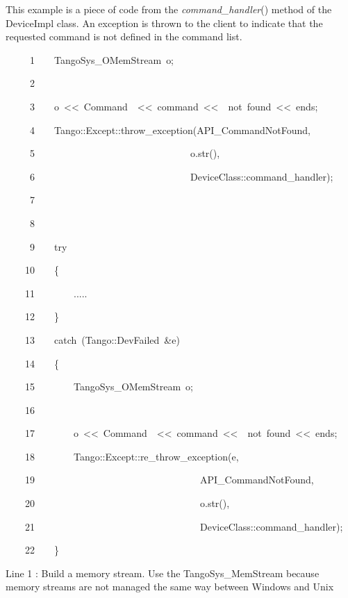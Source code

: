 This example is a piece of code from the \emph{command\_handler}()
method of the DeviceImpl class. An exception is
thrown to the client to indicate that the requested command is not
defined in the command list.


\begin{lyxcode}
~~~~~1~~~~TangoSys\_OMemStream~o;

~~~~~2~~~~~~~~~~~~~~~~~~

~~~~~3~~~~o~<\textcompwordmark{}<~\textquotedbl{}Command~\textquotedbl{}~<\textcompwordmark{}<~command~<\textcompwordmark{}<~\textquotedbl{}~not~found\textquotedbl{}~<\textcompwordmark{}<~ends;

~~~~~4~~~~Tango::Except::throw\_exception(\textquotedbl{}API\_CommandNotFound\textquotedbl{},

~~~~~5~~~~~~~~~~~~~~~~~~~~~~~~~~~~~~~~o.str(),

~~~~~6~~~~~~~~~~~~~~~~~~~~~~~~~~~~~~~~\textquotedbl{}DeviceClass::command\_handler\textquotedbl{});

~~~~~7~~

~~~~~8~~

~~~~~9~~~~try

~~~~10~~~~\{

~~~~11~~~~~~~~.....

~~~~12~~~~\}

~~~~13~~~~catch~(Tango::DevFailed~\&e)

~~~~14~~~~\{

~~~~15~~~~~~~~TangoSys\_OMemStream~o;

~~~~16~~~~~~~~~~~~~~~~~~

~~~~17~~~~~~~~o~<\textcompwordmark{}<~\textquotedbl{}Command~\textquotedbl{}~<\textcompwordmark{}<~command~<\textcompwordmark{}<~\textquotedbl{}~not~found\textquotedbl{}~<\textcompwordmark{}<~ends;

~~~~18~~~~~~~~Tango::Except::re\_throw\_exception(e,

~~~~19~~~~~~~~~~~~~~~~~~~~~~~~~~~~~~~~~~\textquotedbl{}API\_CommandNotFound\textquotedbl{},

~~~~20~~~~~~~~~~~~~~~~~~~~~~~~~~~~~~~~~~o.str(),

~~~~21~~~~~~~~~~~~~~~~~~~~~~~~~~~~~~~~~~\textquotedbl{}DeviceClass::command\_handler\textquotedbl{});

~~~~22~~~~\}
\end{lyxcode}


Line 1 : Build a memory stream. Use the TangoSys\_MemStream because
memory streams are not managed the same way between Windows and Unix

